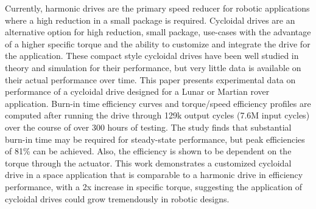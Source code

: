 Currently, harmonic drives are the primary speed reducer for robotic applications where a high reduction in a small package is required. 
Cycloidal drives are an alternative option for high reduction, small package, use-cases with the advantage of a higher specific torque and the ability to customize and integrate the drive for the application.
These compact style cycloidal drives have been well studied in theory and simulation for their performance, but very little data is available on their actual performance over time. 
This paper presents experimental data on performance of a cycloidal drive designed for a Lunar or Martian rover application. 
Burn-in time efficiency curves and torque/speed efficiency profiles are computed after running the drive through 129k output cycles (7.6M input cycles) over the course of over 300 hours of testing. 
The study finds that substantial burn-in time may be required for steady-state performance, but peak efficiencies of 81\% can be achieved. 
Also, the efficiency is shown to be dependent on the torque through the actuator.
This work demonstrates a customized cycloidal drive in a space application that is comparable to a harmonic drive in efficiency performance, with a 2x increase in specific torque, suggesting the application of cycloidal drives could grow tremendously in robotic designs. 
